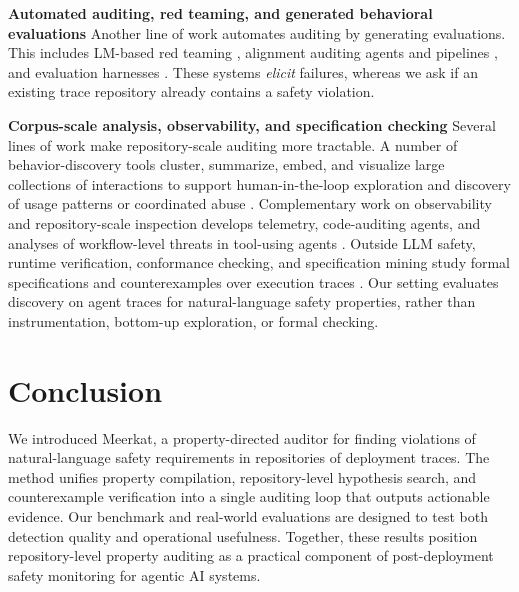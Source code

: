 \documentclass{article} %
\newcommand{\ourmethod}{Meerkat\xspace}
\begin{document}
\textbf{Automated auditing, red teaming, and generated behavioral evaluations}
Another line of work automates auditing by generating evaluations.
This includes LM-based red teaming \citep{perez2022redteaming}, alignment auditing agents and pipelines \citep{bricken2025automating,petri2025,bloom2025,auditbench2026}, and evaluation harnesses \citep{ukaisi2024inspect,openai2023evals,liang2022helm}.
These systems \emph{elicit} failures, whereas we ask if an existing trace repository already contains a safety violation.

\textbf{Corpus-scale analysis, observability, and specification checking}
Several lines of work make repository-scale auditing more tractable. A number of behavior-discovery tools cluster, summarize, embed, and visualize large collections of interactions to support human-in-the-loop exploration and discovery of usage patterns or coordinated abuse \citep{tamkin2024clio,zou2025security,transluce2025docent,zhong2026hodoscope,sumers2025protecting}. Complementary work on observability and repository-scale inspection develops telemetry, code-auditing agents, and analyses of workflow-level threats in tool-using agents \citep{alsayyad2026agenttrace,guo2025repoaudit,liu2023promptinjection,yi2025indirectpromptinjection,zhu2025melon,toolhijacker2025,ferrag2025agentworkflowthreats}. Outside LLM safety, runtime verification, conformance checking, and specification mining study formal specifications and counterexamples over execution traces \citep{havelund2019runtime,taleb2023rvsurvey,deshmukh2017robust,weimer2005specmining}. Our setting evaluates discovery on agent traces for natural-language safety properties, rather than instrumentation, bottom-up exploration, or formal checking.







\section{Conclusion}
We introduced \ourmethod, a property-directed auditor for finding violations of natural-language safety requirements in repositories of deployment traces.
The method unifies property compilation, repository-level hypothesis search, and counterexample verification into a single auditing loop that outputs actionable evidence.
Our benchmark and real-world evaluations are designed to test both detection quality and operational usefulness.
Together, these results position repository-level property auditing as a practical component of post-deployment safety monitoring for agentic AI systems.
\end{document}
